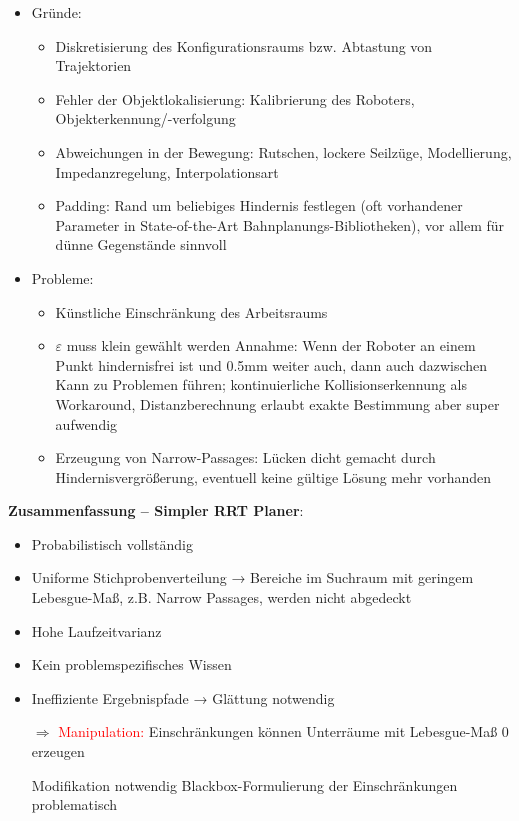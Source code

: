 \begin{itemize}
\item Gründe:
\begin{itemize}
\item Diskretisierung des Konfigurationsraums bzw. Abtastung von Trajektorien
\item Fehler der Objektlokalisierung: Kalibrierung des Roboters, Objekterkennung/-verfolgung
\item Abweichungen in der Bewegung: Rutschen, lockere Seilzüge, Modellierung, Impedanzregelung, Interpolationsart
\item Padding: Rand um beliebiges Hindernis festlegen (oft vorhandener Parameter in State-of-the-Art Bahnplanungs-Bibliotheken), vor allem für dünne Gegenstände sinnvoll
\end{itemize}
\item Probleme:
\begin{itemize}
\item Künstliche Einschränkung des Arbeitsraums
\item $\varepsilon$ muss klein gewählt werden
\ita Annahme: Wenn der Roboter an einem Punkt hindernisfrei ist und 0.5mm weiter auch, dann auch dazwischen
\ita Kann zu Problemen führen; kontinuierliche Kollisionserkennung als Workaround, Distanzberechnung erlaubt exakte Bestimmung aber super aufwendig
\item Erzeugung von Narrow-Passages: Lücken dicht gemacht durch Hindernisvergrößerung, eventuell keine gültige Lösung mehr vorhanden
\end{itemize}
\end{itemize}
\textbf{Zusammenfassung -- Simpler RRT Planer}:
\begin{itemize}
\item Probabilistisch vollständig
\item Uniforme Stichprobenverteilung → Bereiche im Suchraum mit geringem Lebesgue-Maß, z.B. Narrow Passages, werden nicht abgedeckt
\item Hohe Laufzeitvarianz
\item Kein problemspezifisches Wissen
\item Ineffiziente Ergebnispfade → Glättung notwendig
\item[$\Rightarrow$] \textcolor{red}{Manipulation:} Einschränkungen können Unterräume mit Lebesgue-Maß 0 erzeugen
\begin{itemize}
\ita Modifikation notwendig
\ita Blackbox-Formulierung der Einschränkungen problematisch
\end{itemize}
\end{itemize}
